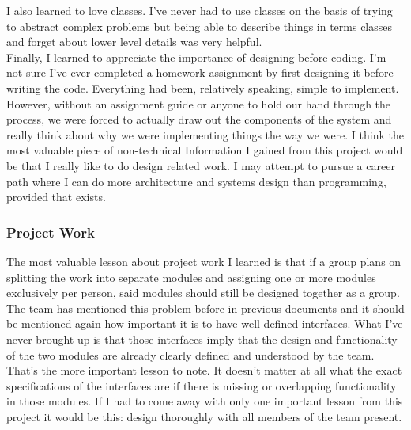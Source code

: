 \documentclass[letterpaper,10pt,titlepage,draftclsnofoot,onecolumn,onesided] {IEEEtran}
\begin{document}
I also learned to love classes. 
I've never had to use classes on the basis of trying to abstract complex problems but being able to describe things in terms classes and forget about lower level details was very helpful. \\

Finally, I learned to appreciate the importance of designing before coding. 
I'm not sure I've ever completed a homework assignment by first designing it before writing the code. 
Everything had been, relatively speaking, simple to implement. 
However, without an assignment guide or anyone to hold our hand through the process, we were forced to actually draw out the components of the system and really think about why we were implementing things the way we were.
I think the most valuable piece of non-technical Information I gained from this project would be that I really like to do design related work. 
I may attempt to pursue a career path where I can do more architecture and systems design than programming, provided that exists. \\ 

\subsubsection{Project Work}
The most valuable lesson about project work I learned is that if a group plans on splitting the work into separate modules and assigning one or more modules exclusively per person, said modules should still be designed together as a group. 
The team has mentioned this problem before in previous documents and it should be mentioned again how important it is to have well defined interfaces. 
What I've never brought up is that those interfaces imply that the design and functionality of the two modules are already clearly defined and understood by the team.
That's the more important lesson to note. 
It doesn't matter at all what the exact specifications of the interfaces are if there is missing or overlapping functionality in those modules. 
If I had to come away with only one important lesson from this project it would be this: design thoroughly with all members of the team present.\\
\end{document}
